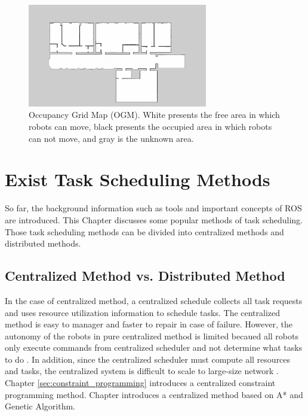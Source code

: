 \begin{enumerate}
    \begin{figure}[htbp]
        \centering
        \includegraphics[width = 0.7\textwidth]{content/images/ch2/occupancy_grid.png}
        \caption{Occupancy Grid Map (OGM). White presents the free area in which robots can move, black presents the occupied area in which robots can not move, and gray is the unknown area.}
        \label{fig:occupancy_grid}
    \end{figure}
\end{enumerate}


\section{Exist Task Scheduling Methods}
\label{sec:exist_task_scheduling_methods}
So far, the background information such as tools and important concepts of ROS are introduced. This Chapter discusses some popular methods of task scheduling. Those task scheduling methods can be divided into centralized methods and distributed methods.

\subsection{Centralized Method vs. Distributed Method}
In the case of centralized method, a centralized schedule collects all task requests and uses resource utilization information to schedule tasks. The centralized method is easy to manager and faster to repair in case of failure. However, the autonomy of the robots in pure centralized method is limited becaued all robots only execute commands from centralized scheduler and not determine what tasks to do \cite{NUNES201755}. In addition, since the centralized scheduler must compute all resources and tasks, the centralized system is difficult to scale to large-size network \cite{CHRISTODOULOPOULOS20091172}.
Chapter \ref{sec:constraint_programming} introduces a centralized constraint programming method. Chapter \label{sec:genetic_method} introduces a centralized method based on A* and Genetic Algorithm.

